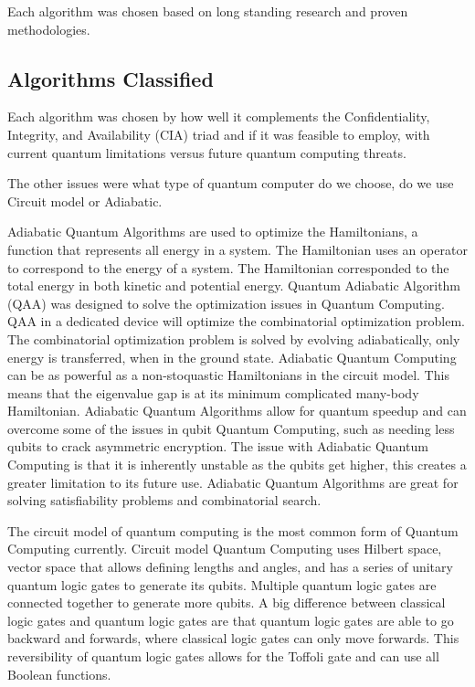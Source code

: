 \documentclass[sigconf]{acmart}
\begin{document}
Each algorithm was chosen based on long standing research and proven methodologies.

\subsection{Algorithms Classified}
Each algorithm was chosen by how well it complements the Confidentiality, Integrity, and Availability (CIA) triad and if it was feasible to employ, with current quantum limitations versus future quantum computing threats. 

The other issues were what type of quantum computer do we choose, do we use Circuit model or Adiabatic. 

Adiabatic Quantum Algorithms are used to optimize the Hamiltonians, a function that represents all energy in a system. The Hamiltonian uses an operator to correspond to the energy of a system. The Hamiltonian corresponded to the total energy in both kinetic and potential energy. Quantum Adiabatic Algorithm (QAA) was designed to solve the optimization issues in Quantum Computing. QAA in a dedicated device will optimize the combinatorial optimization problem. The combinatorial optimization problem is solved by evolving adiabatically, only energy is transferred, when in the ground state. Adiabatic Quantum Computing can be as powerful as a non-stoquastic Hamiltonians in the circuit model. This means that the eigenvalue gap is at its minimum complicated many-body Hamiltonian. Adiabatic Quantum Algorithms allow for quantum speedup and can overcome some of the issues in qubit Quantum Computing, such as needing less qubits to crack asymmetric encryption. The issue with Adiabatic Quantum Computing is that it is inherently unstable as the qubits get higher, this creates a greater limitation to its future use. Adiabatic Quantum Algorithms are great for solving satisfiability problems and combinatorial search. 

The circuit model of quantum computing is the most common form of Quantum Computing currently. Circuit model Quantum Computing uses Hilbert space, vector space that allows defining lengths and angles, and has a series of unitary quantum logic gates to generate its qubits. Multiple quantum logic gates are connected together to generate more qubits. %
A big difference between classical logic gates and quantum logic gates are that quantum logic gates are able to go backward and forwards, where classical logic gates can only move forwards. This reversibility of quantum logic gates allows for the Toffoli gate and can use all Boolean functions.  
\end{document}
